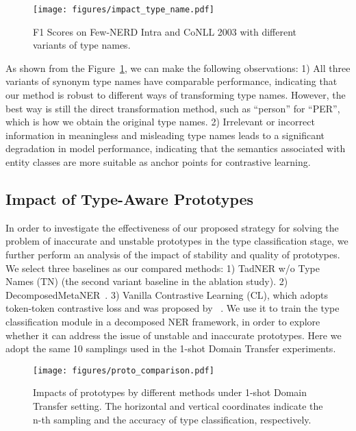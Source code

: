 \documentclass[11pt]{article}
\newcommand{\ours}{{TadNER}\xspace}
\begin{document}
\begin{figure}[htbp]
\vspace{-0mm}
\centering
\texttt{[image: figures/impact\_type\_name.pdf]}
\caption{F1 Scores on Few-NERD Intra and CoNLL 2003 with different variants of type names.}
\label{compare_type_name}
\vspace{-0mm}
\end{figure}

As shown from the Figure~\ref{compare_type_name}, we can make the following observations: 
1) All three variants of synonym type names have comparable performance, indicating that our method is robust to different ways of transforming type names.
However, the best way is still the direct transformation method, such as ``person'' for ``PER'', which is how we obtain the original type names.
2) Irrelevant or incorrect information in meaningless and misleading type names leads to a significant degradation in model performance, indicating that the semantics associated with entity classes are more suitable as anchor points for contrastive learning.

\subsection{Impact of Type-Aware Prototypes}


In order to investigate the effectiveness of our proposed strategy for solving the problem of inaccurate and unstable prototypes in the type classification stage, we further perform an analysis of the impact of stability and quality of prototypes.
We select three baselines as our compared methods: 
1) \ours w/o Type Names (TN) (the second variant baseline in the ablation study). 
2) DecomposedMetaNER~\cite{ma-etal-2022-decomposed}. 
3) Vanilla Contrastive Learning (CL), which adopts token-token contrastive loss and was proposed by ~\citet{das-etal-2022-container}.
We use it to train the type classification module in a decomposed NER framework, in order to explore whether it can address the issue of unstable and inaccurate prototypes.
Here we adopt the same 10 samplings used in the 1-shot {Domain Transfer} experiments.

\begin{figure}[htbp]
\vspace{-0mm}
\centering
\texttt{[image: figures/proto\_comparison.pdf]}
\caption{Impacts of prototypes by different methods under 1-shot {Domain Transfer} setting. 
The horizontal and vertical coordinates indicate the n-th sampling and the accuracy of type classification, respectively.
}
\label{compare_tc_stage}
\vspace{-0mm}
\end{figure}
\end{document}
